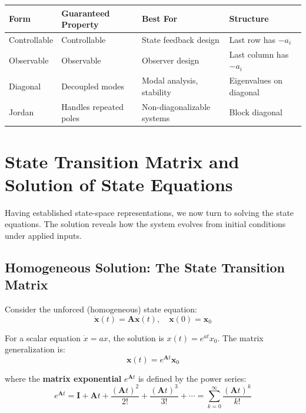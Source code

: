 \begin{center}
\begin{tabular}{llll}
\toprule
\textbf{Form} & \textbf{Guaranteed Property} & \textbf{Best For} & \textbf{Structure} \\
\midrule
Controllable & Controllable & State feedback design & Last row has $-a_i$ \\
Observable & Observable & Observer design & Last column has $-a_i$ \\
Diagonal & Decoupled modes & Modal analysis, stability & Eigenvalues on diagonal \\
Jordan & Handles repeated poles & Non-diagonalizable systems & Block diagonal \\
\bottomrule
\end{tabular}
\end{center}

\section{State Transition Matrix and Solution of State Equations}
\label{sec:state_transition_matrix}

Having established state-space representations, we now turn to solving the state equations. The solution reveals how the system evolves from initial conditions under applied inputs.

\subsection{Homogeneous Solution: The State Transition Matrix}

Consider the unforced (homogeneous) state equation:
\begin{equation}
\dot{\mathbf{x}}(t) = \mathbf{A}\mathbf{x}(t), \quad \mathbf{x}(0) = \mathbf{x}_0
\end{equation}

For a scalar equation $\dot{x} = ax$, the solution is $x(t) = e^{at}x_0$. The matrix generalization is:
\begin{equation}
\boxed{\mathbf{x}(t) = e^{\mathbf{A}t}\mathbf{x}_0}
\end{equation}

where the \textbf{matrix exponential} $e^{\mathbf{A}t}$ is defined by the power series:
\begin{equation}
e^{\mathbf{A}t} = \mathbf{I} + \mathbf{A}t + \frac{(\mathbf{A}t)^2}{2!} + \frac{(\mathbf{A}t)^3}{3!} + \cdots = \sum_{k=0}^{\infty} \frac{(\mathbf{A}t)^k}{k!}
\label{eq:matrix_exp_series}
\end{equation}

